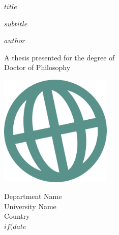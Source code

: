 %
%
%
% 

\thispagestyle{empty} %

\begin{center}
    \vspace*{1cm}
        
    \Huge
    \textbf{$title$}
        
    \vspace{0.5cm}
    \LARGE
    $subtitle$
        
    \vspace{1.5cm}
        
    \textbf{$author$}
        
    \vfill
        
    A thesis presented for the degree of\\
    Doctor of Philosophy
        
    \vspace{0.8cm}
        
    \includegraphics[width=0.4\textwidth]{logo.png}
        
    \Large
    Department Name\\
    University Name\\
    Country\\
    $if(date$
        
\end{center}
